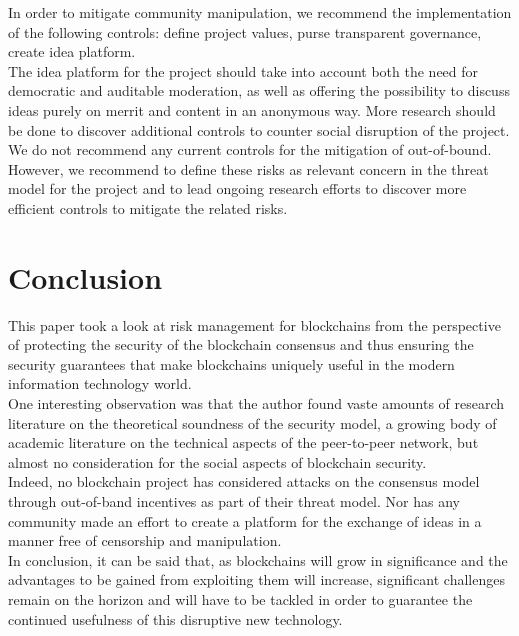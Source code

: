 \documentclass[12pt,a4paper]{article}
\begin{document}
In order to mitigate community manipulation, we recommend the implementation of the following controls: define project values, purse transparent governance, create idea platform.\\

The idea platform for the project should take into account both the need for democratic and auditable moderation, as well as offering the possibility to discuss ideas purely on merrit and content in an anonymous way. More research should be done to discover additional controls to counter social disruption of the project.\\

We do not recommend any current controls for the mitigation of out-of-bound. However, we recommend to define these risks as relevant concern in the threat model for the project and to lead ongoing research efforts to discover more efficient controls to mitigate the related risks.\\

\section{Conclusion}

This paper took a look at risk management for \gls{blockchain}s from the perspective of protecting the security of the blockchain consensus and thus ensuring the security guarantees that make \gls{blockchain}s uniquely useful in the modern information technology world.\\

One interesting observation was that the author found vaste amounts of research literature on the theoretical soundness of the security model, a growing body of academic literature on the technical aspects of the peer-to-peer network, but almost no consideration for the social aspects of blockchain security.\\

Indeed, no blockchain project has considered attacks on the consensus model through out-of-band incentives as part of their threat model. Nor has any community made an effort to create a platform for the exchange of ideas in a manner free of censorship and manipulation.\\

In conclusion, it can be said that, as \gls{blockchain}s will grow in significance and the advantages to be gained from exploiting them will increase, significant challenges remain on the horizon and will have to be tackled in order to guarantee the continued usefulness of this disruptive new technology.\\
\end{document}
